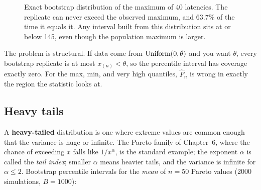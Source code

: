 \begin{figure}[H]
\centering
{}
\caption{Exact bootstrap distribution of the maximum of 40 latencies. The
replicate can never exceed the observed maximum, and $63.7\%$ of the time it
equals it. Any interval built from this distribution sits at or below 145, even
though the population maximum is larger.}
\label{fig:bootstrap-max}
\end{figure}

The problem is structural. If data come from $\operatorname{Uniform}(0, \theta)$ and you want
$\theta$, every bootstrap replicate is at most $x_{(n)} < \theta$, so the
percentile interval has coverage exactly zero. For the max, min, and very high
quantiles, $\hat F_n$ is wrong in exactly the region the statistic looks at.

\subsection{Heavy tails}

A \textbf{heavy-tailed} distribution is one where extreme values are common
enough that the variance is huge or infinite. The Pareto family of Chapter~6,
where the chance of exceeding $x$ falls like $1/x^{\alpha}$, is the standard
example; the exponent $\alpha$ is called the \emph{tail index}; smaller $\alpha$ means heavier tails,
and the variance is infinite for $\alpha \le 2$. Bootstrap percentile
intervals for the \emph{mean} of $n = 50$ Pareto values (2000 simulations,
$B = 1000$):

